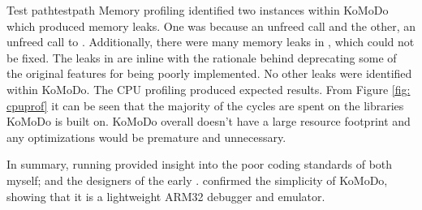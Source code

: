 {
		}{Test path}{testpath}
%
Memory profiling identified two instances within KoMoDo which produced memory leaks. One was because an unfreed call  and the other, an unfreed call to . Additionally, there were many memory leaks in , which could not be fixed. The leaks in  are inline with the rationale behind deprecating some of the original features for being poorly implemented.
%
No other leaks were identified within KoMoDo.
%
The CPU profiling produced expected results. From Figure \ref{fig: cpuprof} it can be seen that the majority of the cycles are spent on the libraries KoMoDo is built on. KoMoDo overall doesn't have a large resource footprint and any optimizations would be premature and unnecessary.

In summary, running  provided insight into the poor coding standards of both myself; and the designers of the early .  confirmed the simplicity of KoMoDo, showing that it is a lightweight ARM32 debugger and emulator.
%
%
%
%
%
